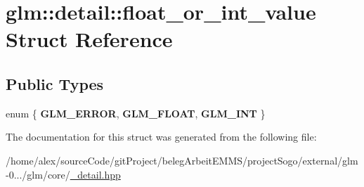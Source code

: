\hypertarget{structglm_1_1detail_1_1float__or__int__value}{\section{glm\-:\-:detail\-:\-:float\-\_\-or\-\_\-int\-\_\-value Struct Reference}
\label{structglm_1_1detail_1_1float__or__int__value}
}
\subsection*{Public Types}
\begin{DoxyCompactItemize}
\item 
enum \{ {\bfseries G\-L\-M\-\_\-\-E\-R\-R\-O\-R}, 
{\bfseries G\-L\-M\-\_\-\-F\-L\-O\-A\-T}, 
{\bfseries G\-L\-M\-\_\-\-I\-N\-T}
 \}
\end{DoxyCompactItemize}


The documentation for this struct was generated from the following file\-:\begin{DoxyCompactItemize}
\item 
/home/alex/source\-Code/git\-Project/beleg\-Arbeit\-E\-M\-M\-S/project\-Sogo/external/glm-\/0.../glm/core/\hyperlink{__detail_8hpp}{\-\_\-detail.\-hpp}\end{DoxyCompactItemize}
